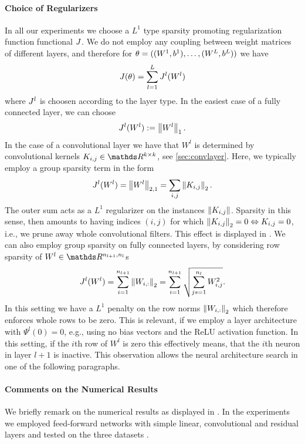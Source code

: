 \paragraph{Choice of Regularizers}
%
In all our experiments we choose a $L^1$ type sparsity promoting regularization function functional $J$. We do not employ any coupling between weight matrices of different layers, and therefore for $\theta=((W^1,b^1),\ldots, (W^L,b^L))$ we have
%
\begin{align*}
	J(\theta) = \sum_{l=1}^L J^l(W^l)
\end{align*}
%
%
where $J^l$ is choosen according to the layer type. In the easiest case of a fully connected layer, we can choose
%
\begin{align*}
	J^l(W^l) := \left\|W^l\right\|_1.
\end{align*}
%
In the case of a convolutional layer we have that $W^l$ is determined by convolutional kernels $K_{i,j}\in\R^{k\times k}$, see \cref{sec:convlayer}. Here, we typically employ a group sparsity term in the form
%
\begin{align*}
	J^l(W^l) = \left\|W^l\right\|_{2,1} = \sum_{i,j} \left\|K_{i,j}\right\|_2.
\end{align*}
%
The outer sum acts as a $L^1$ regularizer on the instances $\left\|K_{i,j}\right\|$. Sparsity in this sense, then amounts to having indices $(i,j)$ for which $\left\|K_{i,j}\right\|_2=0 \Leftrightarrow K_{i,j}=0$, i.e., we prune away whole convolutional filters. This effect is displayed in \cite[Fig. 1]{bungert2022bregman}.
We can also employ group sparsity on fully connected layers, by considering row sparsity of $W^l\in\R^{n_{l+1}, n_l}$s
%
\begin{align*}
	J^l(W^l) = \sum_{i=1}^{n_{l+1}} \left\|W_{i,:}\right\|_2 = \sum_{i=1}^{n_{l+1}} \sqrt{\sum_{js=1}^{n_{l}} W_{i,j}^2}.
\end{align*}
%
%
%
In this setting we have a $L^1$ penalty on the row norms $\left\|W_{i,:}\right\|_2$ which therefore enforces whole rows to be zero. This is relevant, if we employ a layer architecture with $\Psi^l(0)=0$, e.g., using no bias vectors and the ReLU activation function. In this setting, if the $i$th row of $W^l$ is zero this effectively means, that the $i$th neuron in layer $l+1$ is inactive. This observation allows the neural architecture search in one of the following paragraphs.
\paragraph{Comments on the Numerical Results} We briefly remark on the numerical results as displayed in \cite[Sec. 4]{bungert2022bregman}. In the experiments we employed feed-forward networks with simple linear, convolutional and residual layers and tested on the three datasets \cite{krizhevsky2009learning, Han17, leCun10}.

